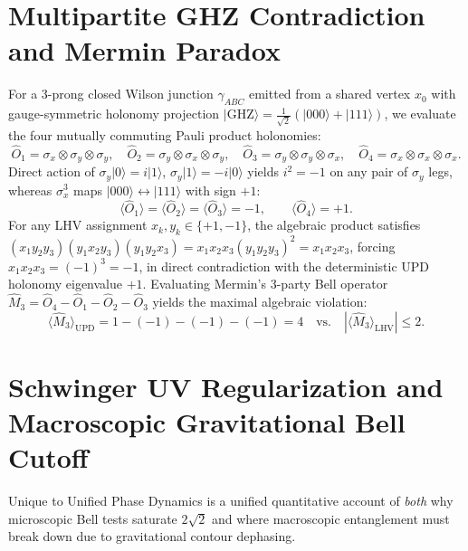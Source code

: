 \documentclass[11pt,a4paper]{article}
\begin{document}
\section{Multipartite GHZ Contradiction and Mermin Paradox}
For a 3-prong closed Wilson junction $\gamma_{ABC}$ emitted from a shared vertex $x_0$ with gauge-symmetric holonomy projection $|\mathrm{GHZ}\rangle = \frac{1}{\sqrt{2}}(|000\rangle + |111\rangle)$, we evaluate the four mutually commuting Pauli product holonomies:
\begin{equation}
\hat{O}_1 = \sigma_x \otimes \sigma_y \otimes \sigma_y, \quad
\hat{O}_2 = \sigma_y \otimes \sigma_x \otimes \sigma_y, \quad
\hat{O}_3 = \sigma_y \otimes \sigma_y \otimes \sigma_x, \quad
\hat{O}_4 = \sigma_x \otimes \sigma_x \otimes \sigma_x.
\end{equation}
Direct action of $\sigma_y|0\rangle = i|1\rangle$, $\sigma_y|1\rangle = -i|0\rangle$ yields $i^2 = -1$ on any pair of $\sigma_y$ legs, whereas $\sigma_x^3$ maps $|000\rangle \leftrightarrow |111\rangle$ with sign $+1$:
\begin{equation}
\langle \hat{O}_1 \rangle = \langle \hat{O}_2 \rangle = \langle \hat{O}_3 \rangle = -1, \qquad \langle \hat{O}_4 \rangle = +1.
\end{equation}
For any LHV assignment $x_k, y_k \in \{+1,-1\}$, the algebraic product satisfies $(x_1 y_2 y_3)(y_1 x_2 y_3)(y_1 y_2 x_3) = x_1 x_2 x_3 (y_1 y_2 y_3)^2 = x_1 x_2 x_3$, forcing $x_1 x_2 x_3 = (-1)^3 = -1$, in direct contradiction with the deterministic UPD holonomy eigenvalue $+1$. Evaluating Mermin's 3-party Bell operator $\hat{M}_3 = \hat{O}_4 - \hat{O}_1 - \hat{O}_2 - \hat{O}_3$ yields the maximal algebraic violation:
\begin{equation}
\langle \hat{M}_3 \rangle_{\mathrm{UPD}} = 1 - (-1) - (-1) - (-1) = 4 \quad \text{vs.} \quad |\langle \hat{M}_3 \rangle_{\mathrm{LHV}}| \le 2.
\end{equation}

\section{Schwinger UV Regularization and Macroscopic Gravitational Bell Cutoff}
Unique to Unified Phase Dynamics is a unified quantitative account of \emph{both} why microscopic Bell tests saturate $2\sqrt{2}$ and where macroscopic entanglement must break down due to gravitational contour dephasing.
\end{document}
